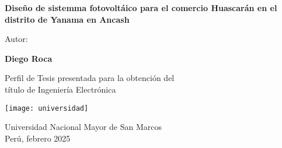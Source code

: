 \begin{titlepage}
  \begin{center}

    \vspace*{0.5cm}
    \Huge 
    \textbf{Diseño de sistemma fotovoltáico para el comercio Huascarán en el distrito de Yanama en Ancash}

    \vspace{0.5cm}
    \LARGE
    Autor:

    \textbf{Diego Roca}
    \vspace{1cm}

    Perfil de Tesis presentada para la obtención del\\
    título de Ingeniería Electrónica

    \vspace{1cm}
    \texttt{[image: universidad]}

    \vfill

    \Large
    Universidad Nacional Mayor de San Marcos\\
    Perú, febrero 2025

  \end{center}
\end{titlepage}

